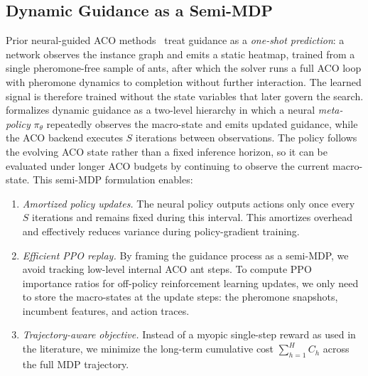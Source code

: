 \subsection{Dynamic Guidance as a Semi-MDP}
\label{sec:mdp}
Prior neural-guided ACO methods~\cite{deepaco,gfacs,gtgaco} treat guidance as a \emph{one-shot prediction}: a network observes the instance graph and emits a static heatmap, trained from a single pheromone-free sample of ants, after which the solver runs a full ACO loop with pheromone dynamics to completion without further interaction. The learned signal is therefore trained without the state variables that later govern the search.
\DyNACO{} formalizes dynamic guidance as a two-level hierarchy in which a neural \emph{meta-policy} $\pi_\theta$ repeatedly observes the macro-state and emits updated guidance, while the ACO backend executes $S$ iterations between observations. The policy follows the evolving ACO state rather than a fixed inference horizon, so it can be evaluated under longer ACO budgets by continuing to observe the current macro-state. This semi-MDP formulation enables:

\begin{enumerate}
\item \emph{Amortized policy updates.} The neural policy outputs actions only once every $S$ iterations and remains fixed during this interval. This amortizes overhead and effectively reduces variance during policy-gradient training.
\item \emph{Efficient PPO replay.} By framing the guidance process as a semi-MDP, we avoid tracking low-level internal ACO ant steps. To compute PPO importance ratios for off-policy reinforcement learning updates, we only need to store the macro-states at the update steps: the pheromone snapshots, incumbent features, and action traces.
\item \emph{Trajectory-aware objective.} Instead of a myopic single-step reward as used in the literature, we minimize the long-term cumulative cost $\sum_{h=1}^H C_h$ across the full MDP trajectory.
\end{enumerate}

